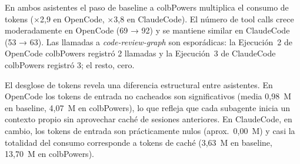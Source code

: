\documentclass[11pt, letterpaper]{article}
\begin{document}
\begin{table}[H]
\centering
{}
\caption{Caso 1 --- ClaudeCode con Haiku~4.5. Caché = tokens leídos de caché. Métricas de calidad calculadas con DCM.}
\label{tab:caso1_claudecode}
\end{table}

En ambos asistentes el paso de baseline a colbPowers multiplica el consumo de tokens ($\times$2,9 en OpenCode, $\times$3,8 en ClaudeCode). El número de tool calls crece moderadamente en OpenCode (69 → 92) y se mantiene similar en ClaudeCode (53 → 63). Las llamadas a \textit{code-review-graph} son esporádicas: la Ejecución~2 de OpenCode colbPowers registró 2 llamadas y la Ejecución~3 de ClaudeCode colbPowers registró 3; el resto, cero.

El desglose de tokens revela una diferencia estructural entre asistentes. En OpenCode los tokens de entrada no cacheados son significativos (media 0,98~M en baseline, 4,07~M en colbPowers), lo que refleja que cada subagente inicia un contexto propio sin aprovechar caché de sesiones anteriores. En ClaudeCode, en cambio, los tokens de entrada son prácticamente nulos (aprox.\ 0,00~M) y casi la totalidad del consumo corresponde a tokens de caché (3,63~M en baseline, 13,70~M en colbPowers).
\end{document}
